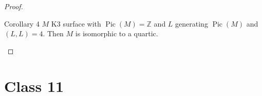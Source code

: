 \begin{proof}
\begin{idea6}{Corollary 4}\leavevmode
	$M$ K3 surface with $\operatorname{Pic}(M) =\mathbb{Z}$ and $L$ generating  $\operatorname{Pic}(M)$ and $(L,L)=4$. Then  $M$ is isomorphic to a quartic.
\end{idea6}
\end{proof}






\section{Class 11}







